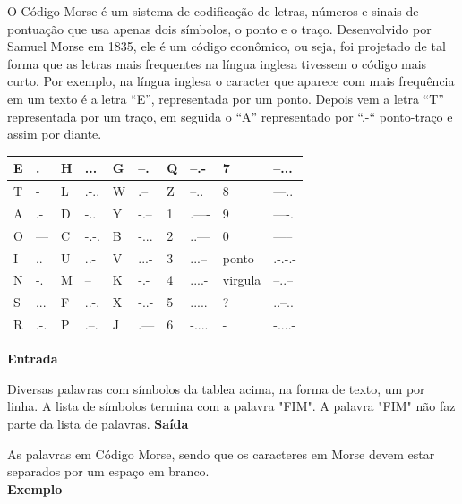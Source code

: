 \documentclass[a4paper, 12pt]{article}
\begin{document}
O Código Morse é um sistema de codificação de letras, números e sinais de pontuação que usa apenas dois símbolos, o ponto e o traço. Desenvolvido por Samuel Morse em 1835, ele é um código econômico, ou seja, foi projetado de tal forma que as letras mais frequentes na língua inglesa tivessem o código mais curto. Por exemplo, na língua inglesa o caracter que aparece com mais frequência em um texto é a letra “E”, representada por um ponto. Depois vem a letra “T” representada por um traço, em seguida o “A” representado por “.-“ ponto-traço e assim por diante.
\begin{table}[htb]
\centering
\begin{tabular}{|l|l|l|l|l|l|l|l|l|l|}
\hline
E & .   & H & ...  & G & --.  & Q & --.-  & 7       & --...  \\ \hline
T & -   & L & .-.. & W & .--  & Z & --..  & 8       & ---..  \\ \hline
A & .-  & D & -..  & Y & -.-- & 1 & .---- & 9       & ----.  \\ \hline
O & --- & C & -.-. & B & -... & 2 & ..--- & 0       & -----  \\ \hline
I & ..  & U & ..-  & V & ...- & 3 & ...-- & ponto   & .-.-.- \\ \hline
N & -.  & M & --   & K & -.-  & 4 & ....- & virgula & --..-- \\ \hline
S & ... & F & ..-. & X & -..- & 5 & ..... & ?       & ..--.. \\ \hline
R & .-. & P & .--. & J & .--- & 6 & -.... & -       & -....- \\ \hline
\end{tabular}
\end{table}
\newline \newline
\textbf{{\large Entrada}} \newline

Diversas palavras com símbolos da tablea acima, na forma de texto, um por linha. A lista de símbolos termina com a palavra "FIM". A palavra "FIM"  não faz parte da lista de palavras.
\newline \newline
\textbf{{\large Saída}} \newline

As palavras em Código Morse, sendo que os caracteres em Morse devem estar separados por um espaço em branco.
\\
\newline \newline
\textbf{{\large Exemplo}} \newline
\end{document}
